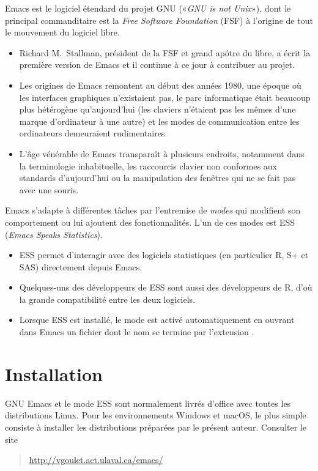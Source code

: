 Emacs est le logiciel étendard du projet GNU («\emph{GNU is not
  Unix}»), dont le principal commanditaire est la \emph{Free Software
  Foundation} (FSF) à l'origine de tout le mouvement du logiciel
libre.
\begin{itemize}
\item Richard M.\ Stallman, président de la FSF et grand apôtre du
  libre, a écrit la première version de Emacs et il continue à ce jour
  à contribuer au projet.
\item Les origines de Emacs remontent au début des années 1980, une
  époque où les interfaces graphiques n'existaient pas, le parc
  informatique était beaucoup plus hétérogène qu'aujourd'hui (les
  claviers n'étaient pas les mêmes d'une marque d'ordinateur à une
  autre) et les modes de communication entre les ordinateurs
  demeuraient rudimentaires.
\item L'âge vénérable de Emacs transparaît à plusieurs endroits,
  notamment dans la terminologie inhabituelle, les raccourcis clavier
  non conformes aux standards d'aujourd'hui ou la manipulation des
  fenêtres qui ne se fait pas avec une souris.
\end{itemize}

Emacs s'adapte à différentes tâches par l'entremise de \emph{modes}
qui modifient son comportement ou lui ajoutent des fonctionnalités.
L'un de ces modes est ESS (\emph{Emacs Speaks Statistics}).
\begin{itemize}
\item ESS permet d'interagir avec des logiciels statistiques (en
  particulier R, S+ et SAS) directement depuis Emacs.
\item Quelques-uns des développeurs de ESS sont aussi des développeurs
  de R, d'où la grande compatibilité entre les deux logiciels.
\item Lorsque ESS est installé, le mode est activé automatiquement en
  ouvrant dans Emacs un fichier dont le nom se termine par l'extension
  .
\end{itemize}


\section{Installation}
\label{emacs+ess:installation}

GNU Emacs et le mode ESS sont normalement livrés d'office avec toutes
les distributions Linux. Pour les environnements Windows et macOS,
le plus simple consiste à installer les distributions préparées par le
présent auteur. Consulter le site
\begin{quote}
  \url{http://vgoulet.act.ulaval.ca/emacs/}
\end{quote}


